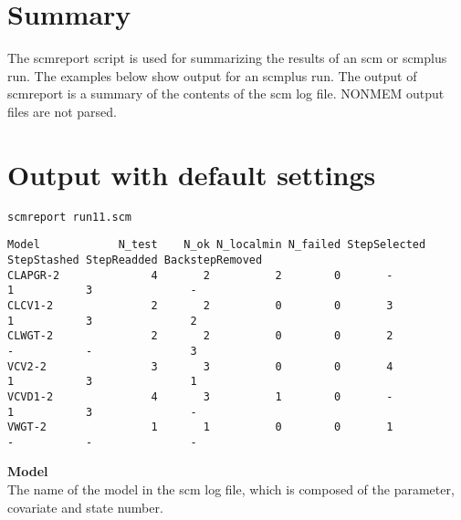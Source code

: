 \documentclass[hideglossary,notoc,hidelof,hidelot,hideTheSignaturePage,hideLinkCurrent,hideloa,pdfLatex,noClient,notitle,hideConfidential]{PMXstyle-20190820}
\begin{document}
\section{Summary}
The scmreport script is used for summarizing the results of an scm or scmplus run.
The examples below show output for an scmplus run.
The output of scmreport is a summary of the contents of the scm log file. 
NONMEM output files are not parsed. 

\section{Output with default settings}
\begin{verbatim}
scmreport run11.scm
\end{verbatim}
{\tiny
\begin{verbatim}
Model            N_test    N_ok N_localmin N_failed StepSelected StepStashed StepReadded BackstepRemoved
CLAPGR-2              4       2          2        0       -           1           3               -
CLCV1-2               2       2          0        0       3           1           3               2
CLWGT-2               2       2          0        0       2           -           -               3
VCV2-2                3       3          0        0       4           1           3               1
VCVD1-2               4       3          1        0       -           1           3               -
VWGT-2                1       1          0        0       1           -           -               -
\end{verbatim}
}


{\bfseries Model}\\
The name of the model in the scm log file, which is composed of the parameter, covariate and state number.



\newpage
\end{document}
